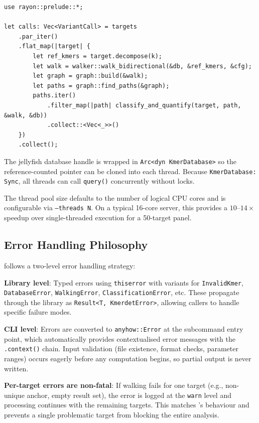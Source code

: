 \begin{lstlisting}[style=rust,
  caption={Parallel target processing (conceptual, from cli/detect.rs).}]
use rayon::prelude::*;

let calls: Vec<VariantCall> = targets
    .par_iter()
    .flat_map(|target| {
        let ref_kmers = target.decompose(k);
        let walk = walker::walk_bidirectional(&db, &ref_kmers, &cfg);
        let graph = graph::build(&walk);
        let paths = graph::find_paths(&graph);
        paths.iter()
            .filter_map(|path| classify_and_quantify(target, path, &walk, &db))
            .collect::<Vec<_>>()
    })
    .collect();
\end{lstlisting}

The jellyfish database handle is wrapped in \texttt{Arc<dyn KmerDatabase>} so
the reference-counted pointer can be cloned into each thread.  Because
\texttt{KmerDatabase: Sync}, all threads can call \texttt{query()} concurrently
without locks.

The thread pool size defaults to the number of logical CPU cores and is
configurable via \texttt{--threads N}.  On a typical 16-core server, this
provides a $10\text{--}14\times$ speedup over single-threaded execution for a
50-target panel.

\subsection{Error Handling Philosophy}
\label{sec:error-handling}

\kmerdet{} follows a two-level error handling strategy:

\textbf{Library level}: Typed errors using \texttt{thiserror} with variants for
\texttt{InvalidKmer}, \texttt{DatabaseError}, \texttt{WalkingError},
\texttt{ClassificationError}, etc.  These propagate through the library as
\texttt{Result<T, KmerdetError>}, allowing callers to handle specific failure
modes.

\textbf{CLI level}: Errors are converted to \texttt{anyhow::Error} at the
subcommand entry point, which automatically provides contextualised error
messages with the \texttt{.context()}  chain.  Input validation (file existence,
format checks, parameter ranges) occurs eagerly before any computation begins,
so partial output is never written.

\textbf{Per-target errors are non-fatal}: If walking fails for one target
(e.g., non-unique anchor, empty result set), the error is logged at the
\texttt{warn} level and processing continues with the remaining targets.  This
matches \km{}'s behaviour and prevents a single problematic target from blocking
the entire analysis.

